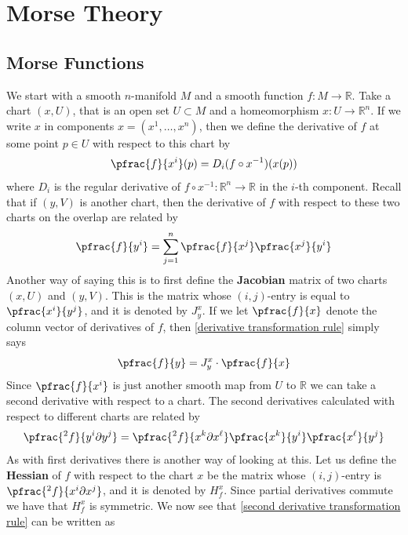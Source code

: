 \newpage
\section{Morse Theory}
\label{Morse Theory}



\subsection{Morse Functions}
\label{Morse Functions}



We start with a smooth $n$-manifold $M$ and a smooth function $f : M \rightarrow \mathbb R$. Take a chart $(x,U)$, that is an open set $U \subset M$ and a homeomorphism $x : U \rightarrow \mathbb R^n$. If we write $x$ in components $x = (x^1,\ldots,x^n)$, then we define the derivative of $f$ at some point $p \in U$ with respect to this chart by
\[ \pfrac{f}{x^i}(p) = D_i (f \circ x^{-1})(x(p)) \]
where $D_i$ is the regular derivative of $f \circ x^{-1} : \mathbb R^n \rightarrow \mathbb R$ in the $i$-th component. Recall that if $(y,V)$ is another chart, then the derivative of $f$ with respect to these two charts on the overlap are related by
\begin{equation}
\label{derivative transformation rule}
\pfrac{f}{y^i} = \sum_{j=1}^n \pfrac{f}{x^j} \pfrac{x^j}{y^i}
\end{equation}
Another way of saying this is to first define the \textbf{Jacobian} matrix of two charts $(x,U)$ and $(y,V)$. This is the matrix whose $(i,j)$-entry is equal to $\pfrac{x^i}{y^j}$, and it is denoted by $J_y^x$. If we let $\pfrac{f}{x}$ denote the column vector of derivatives of $f$, then \eqref{derivative transformation rule} simply says
\[ \pfrac{f}{y} = J_y^x \cdot \pfrac{f}{x} \]
Since $\pfrac{f}{x^i}$ is just another smooth map from $U$ to $\mathbb R$ we can take a second derivative with respect to a chart. The second derivatives calculated with respect to different charts are related by
\begin{equation}
\label{second derivative transformation rule}
\pfrac{^2 f}{y^i \partial y^j} = \pfrac{^2 f}{x^k \partial x^\ell} \pfrac{x^k}{y^i} \pfrac{x^\ell}{y^j}
\end{equation}
As with first derivatives there is another way of looking at this. Let us define the \textbf{Hessian} of $f$ with respect to the chart $x$ be the matrix whose $(i,j)$-entry is $\pfrac{^2 f}{x^i \partial x^j}$, and it is denoted by $H_f^x$. Since partial derivatives commute we have that $H_f^x$ is symmetric. We now see that \eqref{second derivative transformation rule} can be written as
